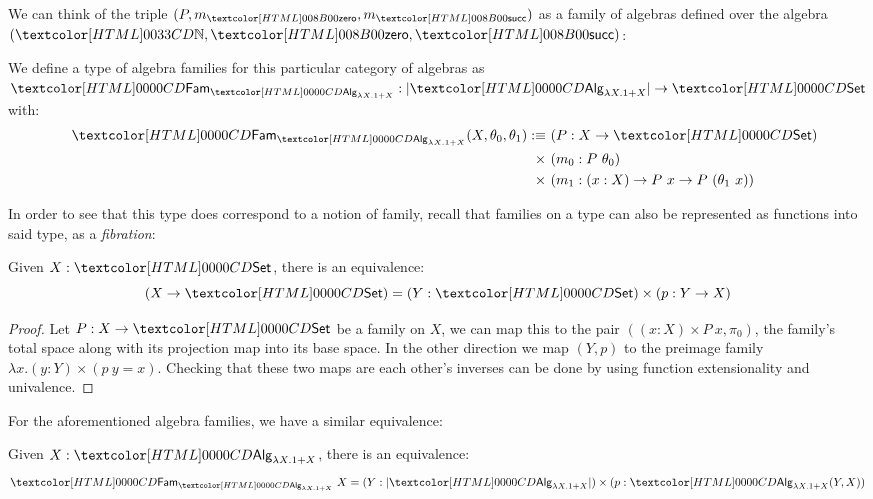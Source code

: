 We can think of the triple $(P,m_{\natzero},m_{\natsucc})$ as a family
of algebras defined over the algebra $(\natty, \natzero, \natsucc)$:

\begin{definition}
  We define a type of algebra families for this particular category of
  algebras as
  $\Fam_{\Alg_{\lambda X . 1 + X}} : | \Alg_{\lambda X . 1 + X} | \to
  \Set$ with:
  \begin{align*}
    &&\Fam_{\Alg_{\lambda X . 1 + X}} (X , \theta_0, \theta_1) \ddefeq&\ (P : X \to \Set) \\
    &&\times&\ (m_0 : P\ \theta_0) \\
    &&\times&\ (m_1 : (x : X) \to P\ x \to P\ (\theta_1\ x))
  \end{align*}
\end{definition}

In order to see that this type does correspond to a notion of family,
recall that families on a type can also be represented as functions
into said type, \ie as a \emph{fibration}:

\begin{proposition}
Given $X : \Set$, there is an equivalence:
$$
(X \to \Set) = (Y : \Set) \times (p : Y \to X)
$$
\end{proposition}

\begin{proof}
  Let $P : X \to \Set$ be a family on $X$, we can map this to the
  pair $((x : X) \times P\ x, \pi_0)$, \ie the family's total space
  along with its projection map into its base space. In the other
  direction we map $(Y,p)$ to the preimage family
  $\lambda x . (y : Y) \times (p\ y = x)$. Checking that these two
  maps are each other's inverses can be done by using function
  extensionality and univalence.
\end{proof}

For the aforementioned algebra families, we have a similar
equivalence:

\begin{proposition}
Given $X : \Alg_{\lambda X . 1 + X}$, there is an equivalence:
$$
\Fam_{\Alg_{\lambda X . 1 + X}}\ X = (Y : | \Alg_{\lambda X . 1 +
  X} |) \times (p : \Alg_{\lambda X . 1 + X}(Y,X))
$$
\end{proposition}

